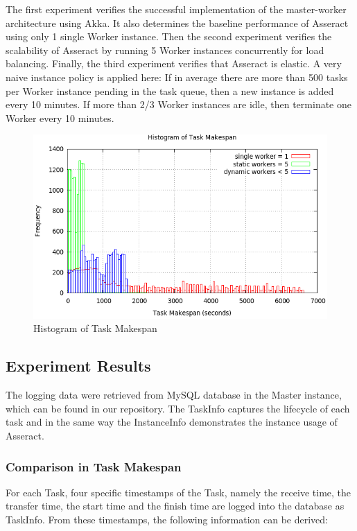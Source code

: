 \documentclass[conference]{IEEEtran}
\begin{document}
The first experiment verifies the successful implementation of the master-worker architecture using Akka. It also determines the baseline performance of Asseract using only 1 single Worker instance. Then the second experiment verifies the scalability of Asseract by running 5 Worker instances concurrently for load balancing. Finally, the third experiment verifies that Asseract is elastic. A very naive instance policy is applied here: If in average there are more than 500 tasks per Worker instance pending in the task queue, then a new instance is added every 10 minutes. If more than 2/3 Worker instances are idle, then terminate one Worker every 10 minutes.

\begin{figure}[H]
\centering
        \includegraphics[totalheight=6cm,width=\linewidth]{makespan.png}
    \caption{Histogram of Task Makespan}
    \label{fig:makespan}
\end{figure}

\subsection{Experiment Results}\label{sec:experimentresults}
The logging data were retrieved from MySQL database in the Master instance, which can be found in our repository. The TaskInfo captures the lifecycle of each task and in the same way the InstanceInfo demonstrates the instance usage of Asseract.

\subsubsection{Comparison in Task Makespan}\label{sec:comparisonmakespan}
For each Task, four specific timestamps of the Task, namely the receive time, the transfer time, the start time and the finish time are logged into the database as TaskInfo. From these timestamps, the following information can be derived:
\end{document}
